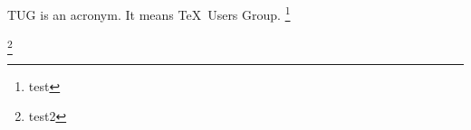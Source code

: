 \documentclass{article}
\begin{document}
\begin{minipage}{3cm}
  TUG is an acronym. It means \TeX\ Users Group.
  \footnote{test}
\end{minipage}
\footnote{test2}
\end{document}
